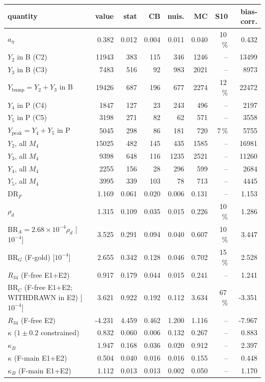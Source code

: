 \begin{tabular}{lrrrrrrr}
\toprule
quantity & value & stat & CB & nuis. & MC & S10 & bias-corr. \\
\midrule
$a_\eta$ & 0.382 & 0.012 & 0.004 & 0.011 & 0.040 & 10\,\% & 0.432 \\
$Y_2$ in B (C2) & 11943 & 383 & 115 & 346 & 1246 & -- & 13499 \\
$Y_3$ in B (C3) & 7483 & 516 & 92 & 983 & 2021 & -- & 8973 \\
$Y_\mathrm{bump}=Y_2+Y_3$ in B & 19426 & 687 & 196 & 677 & 2274 & 12\,\% & 22472 \\
$Y_4$ in P (C4) & 1847 & 127 & 23 & 243 & 496 & -- & 2197 \\
$Y_5$ in P (C5) & 3198 & 271 & 82 & 62 & 571 & -- & 3558 \\
$Y_\mathrm{peak}=Y_4+Y_5$ in P & 5045 & 298 & 86 & 181 & 720 & 7\,\% & 5755 \\
$Y_2$, all $M_4$ & 15025 & 482 & 145 & 435 & 1585 & -- & 16981 \\
$Y_3$, all $M_4$ & 9398 & 648 & 116 & 1235 & 2521 & -- & 11260 \\
$Y_4$, all $M_4$ & 2255 & 156 & 28 & 296 & 599 & -- & 2684 \\
$Y_5$, all $M_4$ & 3995 & 339 & 103 & 78 & 713 & -- & 4445 \\
DR$_F$ & 1.169 & 0.061 & 0.020 & 0.006 & 0.131 & -- & 1.153 \\
$\rho_d$ & 1.315 & 0.109 & 0.035 & 0.015 & 0.226 & 10\,\% & 1.286 \\
BR$_A=2.68\times10^{-4}\rho_d$ [$10^{-4}$] & 3.525 & 0.291 & 0.094 & 0.040 & 0.607 & 10\,\% & 3.447 \\
BR$_G$ (F-gold) [$10^{-4}$] & 2.655 & 0.342 & 0.128 & 0.046 & 0.702 & 15\,\% & 2.528 \\
$R_{34}$ (F-free E1+E2) & 0.917 & 0.179 & 0.044 & 0.015 & 0.241 & -- & 1.241 \\
BR$_C$ (F-free E1+E2; WITHDRAWN in E2) [$10^{-4}$] & 3.621 & 0.922 & 0.192 & 0.112 & 3.634 & 67\,\% & -3.351 \\
$R_{34}$ (F-free E2) & -4.231 & 4.459 & 0.462 & 1.200 & 1.116 & -- & -7.967 \\
$\kappa$ ($1\pm0.2$ constrained) & 0.832 & 0.060 & 0.006 & 0.132 & 0.267 & -- & 0.883 \\
$\kappa_B$ & 1.947 & 0.168 & 0.036 & 0.020 & 0.912 & -- & 2.397 \\
$\kappa$ (F-main E1+E2) & 0.504 & 0.040 & 0.016 & 0.016 & 0.155 & -- & 0.448 \\
$\kappa_B$ (F-main E1+E2) & 1.112 & 0.013 & 0.013 & 0.002 & 0.050 & -- & 1.170 \\
\bottomrule
\end{tabular}
